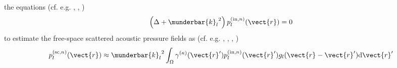 the  equations
(cf. e.g.
\cite[(6.4)]{book:Devaney2012},    %
\cite[47]{book:Natterer2001},           %
\cite[(30)]{book:Kak2001}%
)
\begin{equation}
  \left( \Delta + {\munderbar{k}_{l}}^{2} \right)
  p_{l}^{(\text{in}, n)}( \vect{r} )
  = 0
 \label{eqn:lin_mod_sol_wave_eq_pde_p_in}
\end{equation}
to estimate
the free-space scattered acoustic pressure fields as
(cf. e.g.
\cite[(6.53)]{book:Devaney2012},		%
\cite[(3.16)]{book:Natterer2001},		%
\cite[(40)]{book:Kak2001},			%
\cite[(57)]{book:Born1999}%
)
\begin{equation}
  p_{l}^{(\text{sc}, n)}( \vect{r} )
  \approx
  {\munderbar{k}_{l}}^{2}
  \int_{ \Omega }
    \gamma^{(\kappa)}( \vect{r}' )
    p_{l}^{(\text{in}, n)}( \vect{r}' )
    g_{l}( \vect{r} - \vect{r}' )
  \text{d} \vect{r}'
 \label{eqn:lin_mod_v_rx_p_sc_born}
\end{equation}
